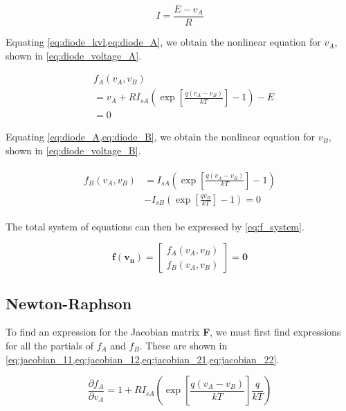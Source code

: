\documentclass[a4paper,titlepage]{article}
\begin{document}
	\begin{equation} \label{eq:diode_kvl}
		I = \frac{E - v_A}{R}
	\end{equation}
	
	Equating \cref{eq:diode_kvl,eq:diode_A}, we obtain the nonlinear equation for $v_A$, shown in \cref{eq:diode_voltage_A}.
	
	\begin{equation} \label{eq:diode_voltage_A}
	\begin{split}
		&f_A(v_A, v_B) \\
		& = v_A + R I_{sA} \left( \exp\left[{\frac{q(v_A - v_B)}{kT}}\right] - 1\right) - E \\
		& = 0
	\end{split}
	\end{equation}
	
	Equating \cref{eq:diode_A,eq:diode_B}, we obtain the nonlinear equation for $v_B$, shown in \cref{eq:diode_voltage_B}.
	
	\begin{align} \label{eq:diode_voltage_B}
	\begin{split}
		f_B(v_A, v_B) &= I_{sA} \left( \exp\left[{\frac{q(v_A - v_B)}{kT}}\right] - 1\right)\\
		&- I_{sB} \left( \exp\left[{\frac{qv_B}{kT}}\right] - 1\right) = 0
	\end{split}
	\end{align}
	
	The total system of equations can then be expressed by \cref{eq:f_system}.
	
	\begin{equation} \label{eq:f_system}
		\mathbf{f}(\mathbf{v_n}) = 
		\begin{bmatrix}
		f_A(v_A, v_B) \\
		f_B(v_A, v_B)
		\end{bmatrix}
		= \mathbf{0}
	\end{equation}
	
	
	\subsection{Newton-Raphson}
	
	To find an expression for the Jacobian matrix \textbf{F}, we must first find expressions for all the partials of $f_A$ and $f_B$. These are shown in \cref{eq:jacobian_11,eq:jacobian_12,eq:jacobian_21,eq:jacobian_22}.
	
	\begin{equation} \label{eq:jacobian_11}
		\frac{\partial f_A}{\partial v_A} = 1 + R I_{sA} \left( \exp\left[{\frac{q(v_A - v_B)}{kT}}\right]\frac{q}{kT}\right)
	\end{equation}
	
\end{document}
